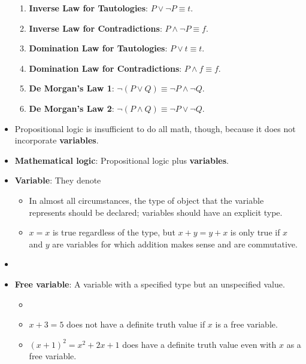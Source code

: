 \documentclass[../main.tex]{subfiles}
\begin{document}
\begin{itemize}
\begin{enumerate}
        \item \textbf{Inverse Law for Tautologies}: $P\vee\neg P\equiv t$.
        \item \textbf{Inverse Law for Contradictions}: $P\wedge\neg P\equiv f$.
        \item \textbf{Domination Law for Tautologies}: $P\vee t\equiv t$.
        \item \textbf{Domination Law for Contradictions}: $P\wedge f\equiv f$.
        \item \textbf{De Morgan's Law 1}: $\neg(P\vee Q)\equiv\neg P\wedge\neg Q$.
        \item \textbf{De Morgan's Law 2}: $\neg(P\wedge Q)\equiv\neg P\vee\neg Q$.
    \end{enumerate}
    \item Propositional logic is insufficient to do all math, though, because it does not incorporate \textbf{variables}.
    \item \textbf{Mathematical logic}: Propositional logic plus \textbf{variables}.
    \item \textbf{Variable}:  They denote 
    \begin{itemize}
        \item In almost all circumstances, the type of object that the variable represents should be declared; variables should have an explicit type.
        \item $x=x$ is true regardless of the type, but $x+y=y+x$ is only true if $x$ and $y$ are variables for which addition makes sense and are commutative.
    \end{itemize}
    \item {}
    \item \textbf{Free variable}: A variable with a specified type but an unspecified value.
    \begin{itemize}
        \item {}
        \item $x+3=5$ does not have a definite truth value if $x$ is a free variable.
        \item $(x+1)^2=x^2+2x+1$ does have a definite truth value even with $x$ as a free variable.

\end{itemize}
\end{itemize}
\end{document}
